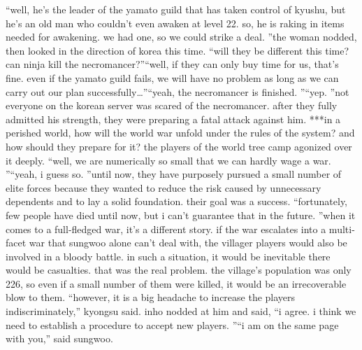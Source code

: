 “well, he’s the leader of the yamato guild that has taken control of kyushu, but he’s an old man who couldn’t even awaken at level 22.
 so, he is raking in items needed for awakening.
 we had one, so we could strike a deal.
”the woman nodded, then looked in the direction of korea this time.
“will they be different this time? can ninja kill the necromancer?”“well, if they can only buy time for us, that’s fine.
 even if the yamato guild fails, we will have no problem as long as we can carry out our plan successfully…”“yeah, the necromancer is finished.
”“yep.
”not everyone on the korean server was scared of the necromancer.
 after they fully admitted his strength, they were preparing a fatal attack against him.
***in a perished world, how will the world war unfold under the rules of the system? and how should they prepare for it? the players of the world tree camp agonized over it deeply.
“well, we are numerically so small that we can hardly wage a war.
”“yeah, i guess so.
”until now, they have purposely pursued a small number of elite forces because they wanted to reduce the risk caused by unnecessary dependents and to lay a solid foundation.
 their goal was a success.
“fortunately, few people have died until now, but i can’t guarantee that in the future.
”when it comes to a full-fledged war, it’s a different story.
 if the war escalates into a multi-facet war that sungwoo alone can’t deal with, the villager players would also be involved in a bloody battle.
 in such a situation, it would be inevitable there would be casualties.
that was the real problem.
 the village’s population was only 226, so even if a small number of them were killed, it would be an irrecoverable blow to them.
“however, it is a big headache to increase the players indiscriminately,” kyongsu said.
inho nodded at him and said, “i agree.
 i think we need to establish a procedure to accept new players.
”“i am on the same page with you,” said sungwoo.

